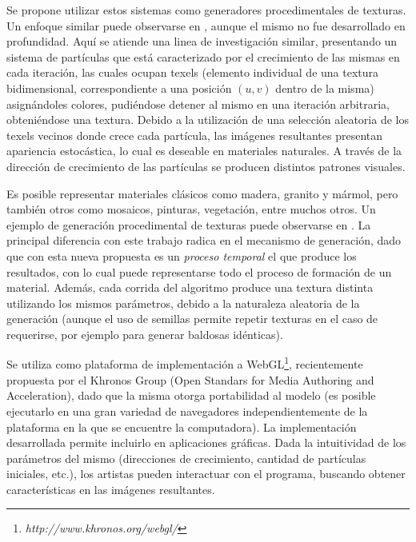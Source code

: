 Se propone utilizar estos sistemas como generadores procedimentales de texturas. Un enfoque similar puede observarse en \cite{Kranidotis98}, aunque el mismo no fue desarrollado en profundidad.
Aquí se atiende una linea de investigaci\'on similar, presentando un sistema de part\'iculas que est\'a caracterizado por el crecimiento de las mismas en cada iteraci\'on, las cuales ocupan texels (elemento individual de una textura bidimensional, correspondiente a una posición $(u,v)$ dentro de la misma) asign\'andoles colores, pudi\'endose detener al mismo en una iteración arbitraria, obteni\'endose una textura.
Debido a la utilización de una selección aleatoria de los texels vecinos donde crece cada partícula, las im\'agenes resultantes presentan apariencia estocástica, lo cual es deseable en materiales naturales.
A trav\'es de la direcci\'on de crecimiento de las part\'iculas se producen distintos patrones visuales.

Es posible representar materiales cl\'asicos como madera, granito y m\'armol, pero tambi\'en otros como mosaicos, pinturas, vegetaci\'on, entre muchos otros.
Un ejemplo de generación procedimental de texturas puede observarse en \cite{Baravalle2010}.
La principal diferencia con este trabajo radica en el mecanismo de generaci\'on, dado que con esta nueva propuesta es un {\em proceso temporal} el que produce los resultados, con lo cual puede representarse todo el proceso de formaci\'on de un material.
Adem\'as, cada corrida del algoritmo produce una textura distinta utilizando los mismos par\'ametros, debido a la naturaleza aleatoria de la generaci\'on (aunque el uso de semillas permite repetir texturas en el caso de requerirse, por ejemplo para generar baldosas id\'enticas).

Se utiliza como plataforma de implementaci\'on a WebGL\footnote{\em http://www.khronos.org/webgl/}, recientemente propuesta por el Khronos Group (Open Standars for Media Authoring and Acceleration), dado que la misma otorga portabilidad al modelo (es posible ejecutarlo en una gran variedad de navegadores independientemente de la plataforma en la que se encuentre la computadora). 
La implementación desarrollada permite incluirlo en aplicaciones gr\'aficas.
Dada la intuitividad de los parámetros del mismo (direcciones de crecimiento, cantidad de partículas iniciales, etc.), los artistas pueden interactuar con el programa, buscando obtener características en las imágenes resultantes.

